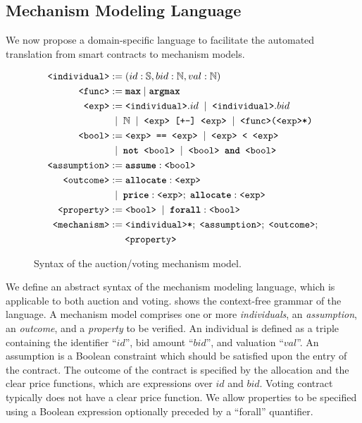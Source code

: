 

\subsection{Mechanism Modeling Language}\label{subsection:syntax}

We now propose a domain-specific language to facilitate the automated translation from smart
contracts to mechanism models.


\begin{figure}[t]
	\small
	\begin{align*}
		\texttt{<individual>}  &:= (id: \mathbb{S}, bid: \mathbb{N}, val: \mathbb{N} ) \\
		\texttt{<func>}        &:= \texttt{\textbf{max}} \;|\; \texttt{\textbf{argmax}} \\
		\texttt{<exp>}         &:= \texttt{<individual>}.id \;\;|\;\; \texttt{<individual>}.bid \\
		&\;\;|\;\; \mathbb{N} \;\;|\;\; \texttt{<exp> \texttt{[+-]} <exp>}
		\;\;|\;\; \texttt{<func>(<exp>*)} \\
		\texttt{<bool>}        &:= \texttt{<exp> == <exp>} \;\;|\;\; \texttt{<exp> < <exp>} \\
		&\;\;|\;\; \texttt{\textbf{not }} \texttt{<bool>} \;\;|\;\; \texttt{<bool>}
		\texttt{\textbf{ and }} \texttt{<bool>} \\
		\texttt{<assumption>}  &:= \texttt{\textbf{assume}} : \texttt{<bool>} \\
		\texttt{<outcome>}     &:= \texttt{\textbf{allocate}} : \texttt{<exp>} \\
		&\;\;|\;\; \texttt{\textbf{price}} : \texttt{<exp>}; \;
		\texttt{\textbf{allocate}} : \texttt{<exp>} \\
		\texttt{<property>}    &:= \texttt{<bool>} \;\;|\;\; \texttt{\textbf{forall}} : \texttt{<bool>} \\
		\texttt{<mechanism>}   &:= \texttt{<individual>*}; \; \texttt{<assumption>}; \;
		\texttt{<outcome>}; \\
		&\quad\;\; \texttt{<property>}
	\end{align*}%
	\caption{Syntax of the auction/voting mechanism model.}\label{syntax}
\end{figure}

We define an abstract syntax of the mechanism modeling language, which is applicable to both auction
and voting.
 shows the context-free grammar of the language.
A mechanism model comprises one or more \emph{individuals}, an \emph{assumption}, an
\emph{outcome}, and a \emph{property} to be verified.
An individual is defined as a triple containing the identifier ``$id$'', bid amount ``$bid$'', and
valuation ``$val$''.
An assumption is a Boolean constraint which should be satisfied upon the entry of the contract.
The outcome of the contract is specified by the allocation and the clear price functions, which are
expressions over $id$ and $bid$.
Voting contract typically does not have a clear price function.
We allow properties to be specified using a Boolean expression optionally preceded by a ``forall''
quantifier.

